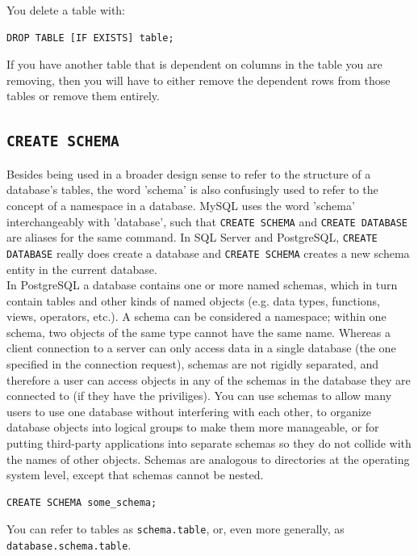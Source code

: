 \documentclass[table, xcdraw]{article}%
\begin{document}
You delete a table with:

\begin{verbatim}
DROP TABLE [IF EXISTS] table;
\end{verbatim}

If you have another table that is dependent on columns in the table you are removing, then you will have to either remove the dependent rows from those tables or remove them entirely.

\subsection{\texttt{CREATE SCHEMA}}

Besides being used in a broader design sense to refer to the structure of a database's tables, the word 'schema' is also confusingly used to refer to the concept of a namespace in a database. MySQL uses the word 'schema' interchangeably with 'database', such that \texttt{CREATE SCHEMA} and \texttt{CREATE DATABASE} are aliases for the same command. In SQL Server and PostgreSQL, \texttt{CREATE DATABASE} really does create a database and \texttt{CREATE SCHEMA} creates a new schema entity in the current database.\\
In PostgreSQL a database contains one or more named schemas, which in turn contain tables and other kinds of named objects (e.g. data types, functions, views, operators, etc.). A schema can be considered a namespace; within one schema, two objects of the same type cannot have the same name. Whereas a client connection to a server can only access data in a single database (the one specified in the connection request), schemas are not rigidly separated, and therefore a user can access objects in any of the schemas in the database they are connected to (if they have the priviliges). You can use schemas to allow many users to use one database without interfering with each other, to organize database objects into logical groups to make them more manageable, or for putting third-party applications into separate schemas so they do not collide with the names of other objects. Schemas are analogous to directories at the operating system level, except that schemas cannot be nested.

\begin{verbatim}
CREATE SCHEMA some_schema;
\end{verbatim}

You can refer to tables as \texttt{schema.table}, or, even more generally, as \texttt{database.schema.table}.
\end{document}
